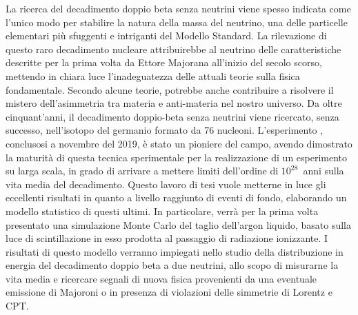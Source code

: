 
La ricerca del decadimento doppio beta senza neutrini viene spesso indicata come l'unico
modo per stabilire la natura della massa del neutrino, una delle particelle elementari
più sfuggenti e intriganti del Modello Standard. La rilevazione di questo raro
decadimento nucleare attribuirebbe al neutrino delle caratteristiche descritte per la
prima volta da Ettore Majorana all'inizio del secolo scorso, mettendo in chiara luce
l'inadeguatezza delle attuali teorie sulla fisica fondamentale. Secondo alcune teorie,
potrebbe anche contribuire a risolvere il mistero dell'asimmetria tra materia e
anti-materia nel nostro universo. Da oltre cinquant'anni, il decadimento doppio-beta senza
neutrini viene ricercato, senza successo, nell'isotopo del germanio formato da 76
nucleoni. L'esperimento \gerda, conclusosi a novembre del 2019, è stato un pioniere del
campo, avendo dimostrato la maturità di questa tecnica sperimentale per la realizzazione
di un esperimento su larga scala, in grado di arrivare a mettere limiti dell'ordine di
$10^{28}$~anni sulla vita media del decadimento. Questo lavoro di tesi vuole metterne in
luce gli eccellenti risultati in quanto a livello raggiunto di eventi di fondo,
elaborando un modello statistico di questi ultimi. In particolare, verrà per la prima
volta presentato una simulazione Monte Carlo del taglio dell'argon liquido, basato sulla luce
di scintillazione in esso prodotta al passaggio di radiazione ionizzante. I risultati di
questo modello verranno impiegati nello studio della distribuzione in energia del
decadimento doppio beta a due neutrini, allo scopo di misurarne la vita media e ricercare
segnali di nuova fisica provenienti da una eventuale emissione di Majoroni o in presenza
di violazioni delle simmetrie di Lorentz e CPT. 

